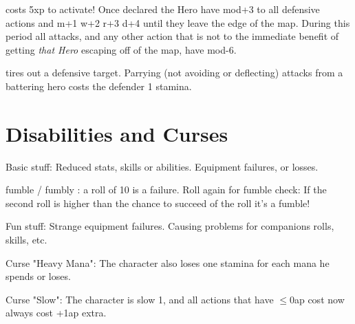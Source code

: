 



 costs 5xp to activate! Once declared the Hero have mod+3 to all defensive actions and m+1 w+2 r+3 d+4 until they leave the edge of the map. During this period all attacks, and any other action that is not to the immediate benefit of getting \emph{that Hero} escaping off of the map, have mod-6.


 tires out a defensive target. Parrying (not avoiding or deflecting) attacks from a battering hero costs the defender 1 stamina.


\closeskillslist














\section*{Disabilities and Curses}


Basic stuff:
Reduced stats, skills or abilities.
Equipment failures, or losses.

fumble / fumbly : a roll of 10 is a failure. Roll again for fumble check: If the second roll is higher than the chance to succeed of the roll it's a fumble!

Fun stuff:
Strange equipment failures.
Causing problems for companions rolls, skills, etc.


Curse "Heavy Mana": The character also loses one stamina for each mana he spends or loses.


Curse "Slow": The character is slow 1, and all actions that have $\leq$0ap cost now always cost +1ap extra.


